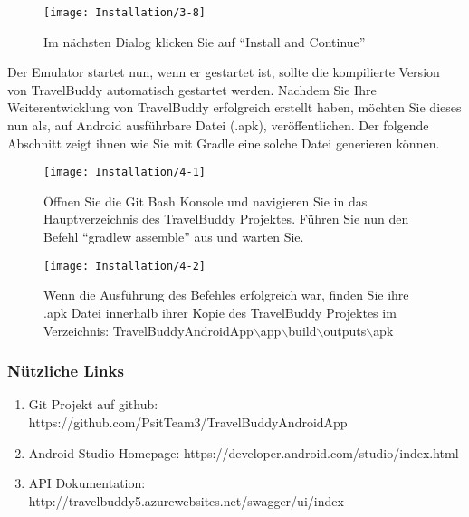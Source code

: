 \begin{figure}
  \centering
  \texttt{[image: Installation/3-8]}
  \caption{Im nächsten Dialog klicken Sie auf ``Install and Continue''}
\end{figure}

Der Emulator startet nun, wenn er gestartet ist, sollte die kompilierte Version von TravelBuddy automatisch gestartet werden.
Nachdem Sie Ihre Weiterentwicklung von TravelBuddy erfolgreich erstellt haben, möchten Sie dieses nun als, auf Android ausführbare Datei (.apk), veröffentlichen.
Der folgende Abschnitt zeigt ihnen wie Sie mit Gradle eine solche Datei generieren können.

\begin{figure}
  \centering
  \begin{minipage}[b]{0.48\textwidth}
    \texttt{[image: Installation/4-1]}
    \caption{Öffnen Sie die Git Bash Konsole und navigieren Sie in das Hauptverzeichnis des TravelBuddy Projektes. Führen Sie nun den Befehl ``gradlew assemble'' aus und warten Sie.}
  \end{minipage}
  \hfill
  \begin{minipage}[b]{0.48\textwidth}
    \texttt{[image: Installation/4-2]}
    \caption{Wenn die Ausführung des Befehles erfolgreich war, finden Sie ihre .apk Datei innerhalb ihrer Kopie des TravelBuddy Projektes im Verzeichnis: TravelBuddyAndroidApp$\backslash$app$\backslash$build$\backslash$outputs$\backslash$apk}
  \end{minipage}
\end{figure}

\subsubsection{Nützliche Links}
  \begin{enumerate}
    \item Git Projekt auf github: https://github.com/PsitTeam3/TravelBuddyAndroidApp
    \item Android Studio Homepage: https://developer.android.com/studio/index.html
    \item API Dokumentation: http://travelbuddy5.azurewebsites.net/swagger/ui/index
  \end{enumerate}
